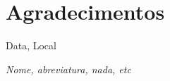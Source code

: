 \chapter*{Agradecimentos}

\lipsum[1]

\vspace{15mm}

\begin{minipage}{.45\linewidth}
\begin{flushleft}
Data, Local
\end{flushleft}
\end{minipage}
\begin{minipage}{.45\linewidth}
\begin{flushright}
\textit{Nome, abreviatura, nada, etc}
\end{flushright}
\end{minipage}
